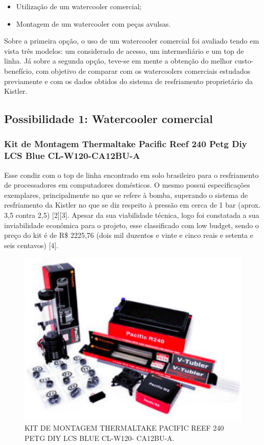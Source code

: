 \begin{itemize}
\item Utilização de um watercooler comercial;
\item Montagem de um watercooler com peças avulsas.
\end{itemize}

Sobre a primeira opção, o uso de um watercooler comercial foi avaliado tendo em vista três modelos: um considerado de acesso, um intermediário e um top de linha. Já sobre a segunda opção, teve-se em mente a obtenção do melhor custo-benefício, com objetivo de comparar com os watercoolers comerciais estudados previamente e com os dados obtidos do sistema de resfriamento proprietário da Kistler.

\subsection{Possibilidade 1: Watercooler comercial}

\subsubsection{Kit de Montagem Thermaltake Pacific Reef 240 Petg Diy LCS Blue CL-W120-CA12BU-A}

Esse condiz com o top de linha encontrado em solo brasileiro para o resfriamento de processadores em computadores domésticos. O mesmo possui especificações exemplares, principalmente no que se refere à bomba, superando o sistema de resfriamento da Kistler no que se diz respeito à pressão em cerca de 1 bar (aprox. 3,5 contra 2,5) [2][3].
Apesar da sua viabilidade técnica, logo foi constatada a sua inviabilidade econômica para o projeto, esse classificado com low budget, sendo o preço do kit é de R\$ 2225,76 (dois mil duzentos e vinte e cinco reais e setenta e seis centavos) [4].

\begin{figure}[!htb]                                                               
   \centering                                                                      
   \includegraphics[scale=0.4, keepaspectratio=true]{figuras/watercooler1.eps}
   \caption{KIT DE MONTAGEM THERMALTAKE PACIFIC REEF 240 PETG DIY LCS BLUE CL-W120- CA12BU-A.}               
\end{figure}

